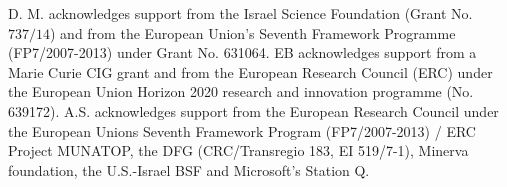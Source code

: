 \documentclass[twocolumn,aps,prb,showpacs]{revtex4-1}
\begin{document}
D. M. acknowledges  support from the  Israel Science Foundation (Grant No. $ 737/14$) and
from the European Union's Seventh Framework Programme (FP7/2007-2013) under Grant No. 631064. EB acknowledges support from a Marie Curie CIG grant and from the European Research Council (ERC) under the European Union Horizon 2020 research and innovation programme (No. 639172). A.S. acknowledges support from the European
Research Council under the European Unions
Seventh Framework Program (FP7/2007-2013) / ERC
Project MUNATOP, the DFG (CRC/Transregio 183, EI
519/7-1), Minerva foundation, the U.S.-Israel BSF and Microsoft's Station Q.
\end{document}
